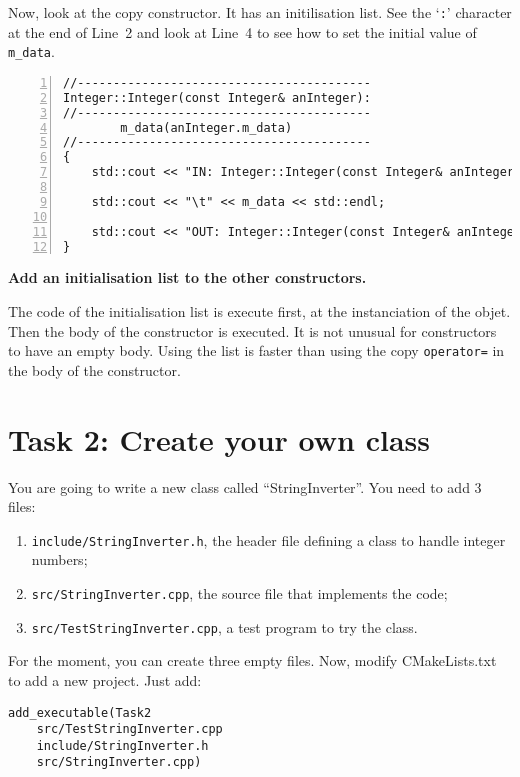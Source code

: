 Now, look at the copy constructor. 
It has an initilisation list. See the `\verb+:+' character at the end of Line~2 and look at Line~4 to see how to set the initial value of \verb+m_data+.
\begin{lstlisting}[numbers=left]
//-----------------------------------------
Integer::Integer(const Integer& anInteger):
//-----------------------------------------
        m_data(anInteger.m_data)
//-----------------------------------------
{
    std::cout << "IN: Integer::Integer(const Integer& anInteger)" << std::endl;

    std::cout << "\t" << m_data << std::endl;

    std::cout << "OUT: Integer::Integer(const Integer& anInteger)" << std::endl;
}
\end{lstlisting}

\large\textbf{Add an initialisation list to the other constructors.}

The code of the initialisation list is execute first, at the instanciation of the objet. 
Then the body of the constructor is executed. 
It is not unusual for constructors to have an empty body. 
Using the list is faster than using the copy \verb+operator=+ in the body of the constructor. 


\section{Task 2: Create your own class}

You are going to write a new class called ``StringInverter''. 
You need to add 3 files:
\begin{enumerate}
  \item \verb+include/StringInverter.h+, the header file defining a class to handle integer numbers;
  \item \verb+src/StringInverter.cpp+, the source file that implements the code;
  \item \verb+src/TestStringInverter.cpp+, a test program to try the class.
\end{enumerate}
For the moment, you can create three empty files. 
Now, modify CMakeLists.txt to add a new project. 
Just add:
\begin{lstlisting}
add_executable(Task2 
	src/TestStringInverter.cpp 
	include/StringInverter.h 
	src/StringInverter.cpp)
\end{lstlisting}

